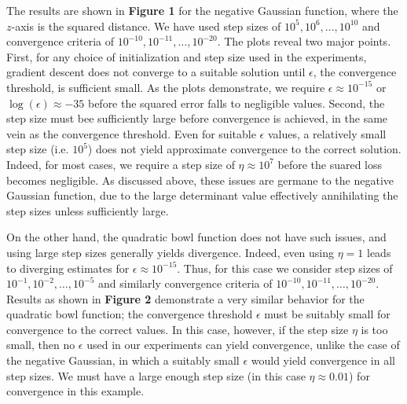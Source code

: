 \documentclass[10pt,psamsfonts]{amsart}
\theoremstyle{definition}
\theoremstyle{remark}
\numberwithin{equation}{section}
\begin{document}
The results are shown in {\bf Figure 1} for the negative Gaussian function, where the $z$-axis is the squared distance. We have used step sizes of $10^5, 10^6, \dots, 10^10$ and convergence criteria of $10^{-10}, 10^{-11}, \dots, 10^{-20}$. The plots reveal two major points. First, for any choice of initialization and step size used in the experiments, gradient descent does not converge to a suitable solution until $\epsilon$, the convergence threshold, is sufficient small. As the plots demonstrate, we require $\epsilon \approx 10^{-15}$ or $\log(\epsilon) \approx -35$ before the squared error falls to negligible values. Second, the step size must bee sufficiently large before convergence is achieved, in the same vein as the convergence threshold. Even for suitable $\epsilon$ values, a relatively small step size (i.e. $10^5$) does not yield approximate convergence to the correct solution. Indeed, for most cases, we require a step size of $\eta \approx 10^7$ before the suared loss becomes negligible. As discussed above, these issues are germane to the negative Gaussian function, due to the large determinant value effectively annihilating the step sizes unless sufficiently large.

On the other hand, the quadratic bowl function does not have such issues, and using large step sizes generally yields divergence. Indeed, even using $\eta = 1$ leads to diverging estimates for $\epsilon \approx 10^{-15}$. Thus, for this case we consider step sizes of $10^{-1}, 10^{-2}, \dots, 10^{-5}$ and similarly convergence criteria of $10^{-10}, 10^{-11}, \dots, 10^{-20}$. Results as shown in {\bf Figure 2} demonstrate a very similar behavior for the quadratic bowl function; the convergence threshold $\epsilon$ must be suitably small for convergence to the correct values. In this case, however, if the step size $\eta$ is too small, then no $\epsilon$ used in our experiments can yield convergence, unlike the case of the negative Gaussian, in which a suitably small $\epsilon$ would yield convergence in all step sizes. We must have a large enough step size (in this case $\eta \approx 0.01$) for convergence in this example.
\end{document}
